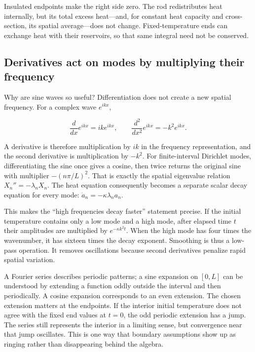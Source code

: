 Insulated endpoints make the right side zero. The rod redistributes heat internally, but its total excess heat---and, for constant heat capacity and cross-section, its spatial average---does not change. Fixed-temperature ends can exchange heat with their reservoirs, so that same integral need not be conserved.

\subsection{Derivatives act on modes by multiplying their frequency}\label{04-visual-computing-ii-ch030-derivatives-act-on-modes-by-multiplying-their-frequency}

\hypertarget{04-visual-computing-ii-ch030-derivatives-act-on-modes-by-multiplying-their-frequency}{}

Why are sine waves so useful? Differentiation does not create a new spatial frequency. For a complex wave \(e^{ikx}\),

\[
\frac{d}{dx}e^{ikx}=ik e^{ikx},
\qquad
\frac{d^2}{dx^2}e^{ikx}=-k^2 e^{ikx}.
\]

A derivative is therefore multiplication by \(ik\) in the frequency representation, and the second derivative is multiplication by \(-k^2\). For finite-interval Dirichlet modes, differentiating the sine once gives a cosine, then twice returns the original sine with multiplier \(-(n\pi/L)^2\). That is exactly the spatial eigenvalue relation \(X_n''=-\lambda_nX_n\). The heat equation consequently becomes a separate scalar decay equation for every mode: \(\dot a_n=-\kappa\lambda_na_n\).

This makes the ``high frequencies decay faster'' statement precise. If the initial temperature contains only a low mode and a high mode, after elapsed time \(t\) their amplitudes are multiplied by \(e^{-\kappa k^2t}\). When the high mode has four times the wavenumber, it has sixteen times the decay exponent. Smoothing is thus a low-pass operation. It removes oscillations because second derivatives penalize rapid spatial variation.

A Fourier series describes periodic patterns; a sine expansion on \([0,L]\) can be understood by extending a function oddly outside the interval and then periodically. A cosine expansion corresponds to an even extension. The chosen extension matters at the endpoints. If the interior initial temperature does not agree with the fixed end values at \(t=0\), the odd periodic extension has a jump. The series still represents the interior in a limiting sense, but convergence near that jump oscillates. This is one way that boundary assumptions show up as ringing rather than disappearing behind the algebra.

